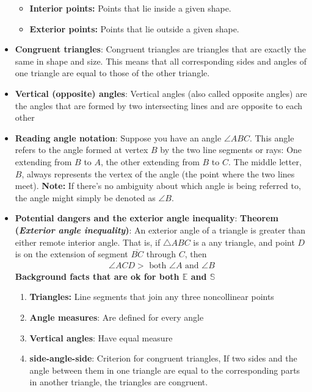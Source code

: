 \documentclass{report}
\begin{document}
\begin{itemize}
\begin{itemize}
                \item \textbf{Interior points:} Points that lie inside a given shape.
                \item \textbf{Exterior points:} Points that lie outside a given shape.
            \end{itemize}
        \item \textbf{Congruent triangles}: Congruent triangles are triangles that are exactly the same in shape and size. This means that all corresponding sides and angles of one triangle are equal to those of the other triangle.
        \item \textbf{Vertical (opposite) angles}: Vertical angles (also called opposite angles) are the angles that are formed by two intersecting lines and are opposite to each other
        \item \textbf{Reading angle notation}: Suppose you have an angle $\angle ABC$. This angle refers to the angle formed at vertex $B$ by the two line segments or rays:
            \bigbreak \noindent 
            One extending from $B$ to $A$, the other extending from $B$ to $C$. The middle letter, $B$, always represents the vertex of the angle (the point where the two lines meet).
            \bigbreak \noindent 
            \textbf{Note:} If there’s no ambiguity about which angle is being referred to, the angle might simply be denoted as $\angle B$.
        \item \textbf{Potential dangers and the exterior angle inequality}:
            \bigbreak \noindent 
            \textbf{Theorem (\textit{Exterior angle inequality})}: An exterior angle of a triangle is greater than either remote interior angle. That is, if $\triangle ABC$ is a any triangle, and point $D$ is on the extension of segment $\overline{BC}$ through $C$, then
            \begin{align*}
                \angle ACD > \text{ both } \angle A \text{ and } \angle B
            \end{align*}
            \bigbreak \noindent 
            \textbf{Background facts that are ok for both $\mathbb{E}$ and $\mathbb{S}$}
            \begin{enumerate}
                \item \textbf{Triangles:} Line segments that join any three noncollinear points
                \item \textbf{Angle measures}: Are defined for every angle
                \item \textbf{Vertical angles}: Have equal measure
                \item \textbf{side-angle-side}: Criterion for congruent triangles, If two sides and the angle between them in one triangle are equal to the corresponding parts in another triangle, the triangles are congruent.

\end{enumerate}
\end{itemize}
\end{document}
